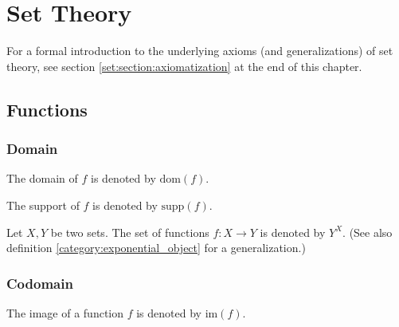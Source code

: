 \chapter{Set Theory}

    For a formal introduction to the underlying axioms (and generalizations) of set theory, see section \ref{set:section:axiomatization} at the end of this chapter.

\section{Functions}
\subsection{Domain}

    \begin{notation}
        The domain of $f$ is denoted by $\text{dom}(f)$.
    \end{notation}

    \begin{notation}
        The support of $f$ is denoted by $\text{supp}(f)$.
    \end{notation}

    \begin{notation}\label{set:function_set}
        Let $X, Y$ be two sets. The set of functions $f:X\rightarrow Y$ is denoted by $Y^X$. (See also definition \ref{category:exponential_object} for a generalization.)
    \end{notation}

\subsection{Codomain}

    \begin{notation}
        The image of a function $f$ is denoted by $\text{im}(f)$.
    \end{notation}

